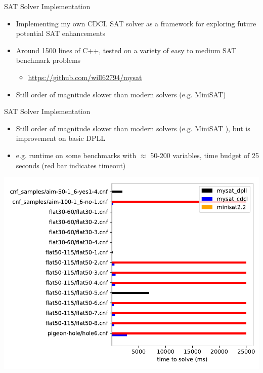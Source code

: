 \documentclass{beamer}
\begin{document}

\begin{frame}{SAT Solver Implementation}
    \begin{itemize}[<+->]
        \item Implementing my own CDCL SAT solver as a framework for exploring future potential SAT enhancements
        \item Around 1500 lines of C++, tested on a variety of easy to medium SAT benchmark problems
        \begin{itemize}
            \item \url{https://github.com/will62794/mysat} 
        \end{itemize}
        \item Still order of magnitude slower than modern solvers (e.g. MiniSAT)
    \end{itemize}
\end{frame}

\begin{frame}{SAT Solver Implementation}
    \begin{itemize}
        \item Still order of magnitude slower than modern solvers (e.g. MiniSAT \cite{04minisat}), but is improvement on basic DPLL
        \pause
        \item e.g. runtime on some benchmarks with $\approx$ 50-200 variables, time budget of 25 seconds (red bar indicates timeout)
    \end{itemize}
    \begin{center}
        \includegraphics[scale=0.45]{../../results/compare.pdf}
    \end{center}
\end{frame}
\end{document}
